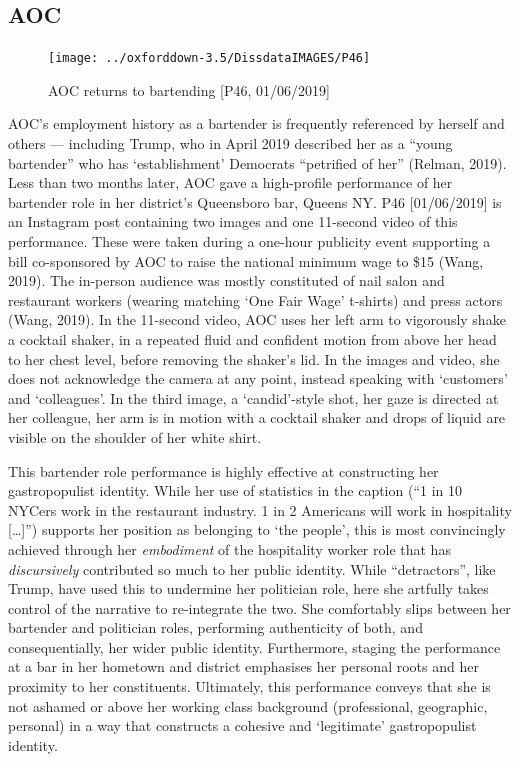 \documentclass[a4paper, nobind]{templates/ociamthesis}
\begin{document}
\hypertarget{aoc-1}{%
\subsection*{AOC}\label{aoc-1}}

\begin{figure}
\texttt{[image: ../oxforddown-3.5/DissdataIMAGES/P46]} \caption{AOC returns to bartending [P46, 01/06/2019]}\label{fig:unnamed-chunk-23}
\end{figure}

AOC's employment history as a bartender is frequently referenced by herself and others --- including Trump, who in April 2019 described her as a ``young bartender'' who has `establishment' Democrats ``petrified of her'' (Relman, 2019).
Less than two months later, AOC gave a high-profile performance of her bartender role in her district's Queensboro bar, Queens NY. P46 {[}01/06/2019{]} is an Instagram post containing two images and one 11-second video of this performance.
These were taken during a one-hour publicity event supporting a bill co-sponsored by AOC to raise the national minimum wage to \$15 (Wang, 2019).
The in-person audience was mostly constituted of nail salon and restaurant workers (wearing matching `One Fair Wage' t-shirts) and press actors (Wang, 2019).
In the 11-second video, AOC uses her left arm to vigorously shake a cocktail shaker, in a repeated fluid and confident motion from above her head to her chest level, before removing the shaker's lid.
In the images and video, she does not acknowledge the camera at any point, instead speaking with `customers' and `colleagues'.
In the third image, a `candid'-style shot, her gaze is directed at her colleague, her arm is in motion with a cocktail shaker and drops of liquid are visible on the shoulder of her white shirt.

This bartender role performance is highly effective at constructing her gastropopulist identity.
While her use of statistics in the caption (``1 in 10 NYCers work in the restaurant industry. 1 in 2 Americans will work in hospitality {[}\ldots{]}'') supports her position as belonging to `the people', this is most convincingly achieved through her \emph{embodiment} of the hospitality worker role that has \emph{discursively} contributed so much to her public identity.
While ``detractors'', like Trump, have used this to undermine her politician role, here she artfully takes control of the narrative to re-integrate the two.
She comfortably slips between her bartender and politician roles, performing authenticity of both, and consequentially, her wider public identity.
Furthermore, staging the performance at a bar in her hometown and district emphasises her personal roots and her proximity to her constituents.
Ultimately, this performance conveys that she is not ashamed or above her working class background (professional, geographic, personal) in a way that constructs a cohesive and `legitimate' gastropopulist identity.
\end{document}
